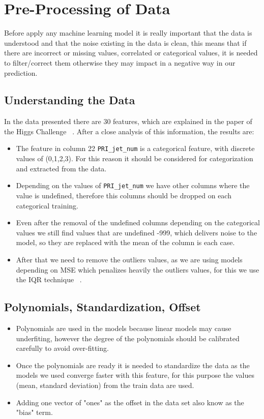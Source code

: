 \documentclass[10pt,conference,compsocconf]{IEEEtran}
\begin{document}
\section{Pre-Processing of Data}

\label{sec:Pre-Processing of Data}

Before apply any machine learning model it is really important that 
the data is understood and that the noise existing in the data is clean, 
this means that if there are incorrect or missing values, correlated or
categorical values, it is needed to filter/correct them otherwise
they may impact in a negative way in our prediction.

\subsection{Understanding the Data}
In the data presented there are 30 features, which are explained in 
the paper of the Higgs Challenge ~\cite{higgs_challenge01}. After a 
close analysis of this information, the results are:

\begin{itemize}
 \label{text:categorical}
\item The feature in column 22 \texttt{PRI\_jet\_num} is a categorical feature,
with discrete values of (0,1,2,3). For this reason it should be considered
for categorization and extracted from the data.
\item Depending on the values of \texttt{PRI\_jet\_num}  we have other columns
where the value is undefined, therefore this columns should be dropped 
on each categorical training.
\item Even after the removal of the undefined columns depending on the
categorical values we still find values that are undefined -999, which delivers
noise to the model, so they are replaced with the mean of the column is each
case.
\item After that we need to remove the outliers values, as we are using models
depending on MSE which penalizes heavily the outliers values, for this we use
the IQR technique ~\cite{IQR01}.

\end{itemize}

\subsection{Polynomials, Standardization, Offset}
 \label{text:datasteps}
\begin{itemize}
\item Polynomials are used in the models because linear models may cause
underfiting, however the degree of the polynomials should be calibrated carefully
to avoid over-fitting.
\item Once the polynomials are ready it is needed to standardize the data 
as the models we used converge faster with this feature, for this purpose 
the values (mean, standard deviation) from the train data  are used.
\item Adding one vector of "ones" as the offset in the data set also know as the
"bias" term.

\end{itemize}
\end{document}
